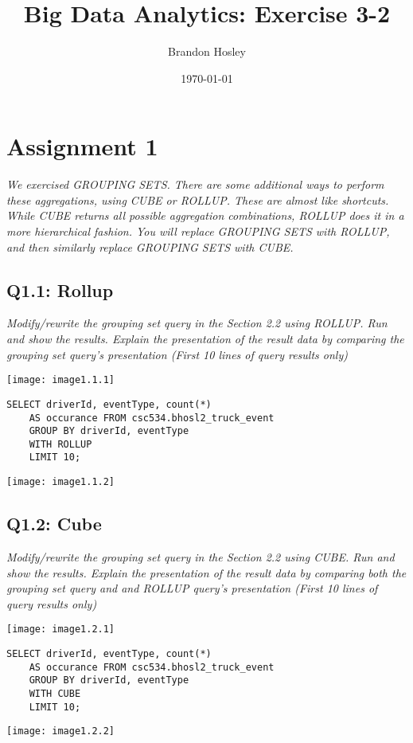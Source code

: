 \documentclass[]{article}
\title{Big Data Analytics: Exercise 3-2}
\author{Brandon Hosley}
\date{\today}
\begin{document}
\maketitle

\section*{Assignment 1}
\emph{We exercised GROUPING SETS. There are some additional ways to perform these aggregations, using CUBE or ROLLUP. These are almost like shortcuts. While CUBE returns all possible aggregation combinations, ROLLUP does it in a more hierarchical fashion. You will replace GROUPING SETS with ROLLUP, and then similarly replace GROUPING SETS with CUBE.}

\subsection*{Q1.1: Rollup} 
\emph{Modify/rewrite the grouping set query in the Section 2.2 using ROLLUP. Run and show the results. Explain the presentation of the result data by comparing the grouping set query’s presentation
(First 10 lines of query results only)}

\texttt{[image: image1.1.1]} %
\begin{verbatim}
SELECT driverId, eventType, count(*) 
	AS occurance FROM csc534.bhosl2_truck_event 
	GROUP BY driverId, eventType 
	WITH ROLLUP
	LIMIT 10;
\end{verbatim}
\texttt{[image: image1.1.2]} %

\subsection*{Q1.2: Cube} 
\emph{Modify/rewrite the grouping set query in the Section 2.2 using CUBE. Run and show the results. Explain the presentation of the result data by comparing both the grouping set query and and ROLLUP query’s presentation
(First 10 lines of query results only)}

\texttt{[image: image1.2.1]} %
\begin{verbatim}
SELECT driverId, eventType, count(*) 
	AS occurance FROM csc534.bhosl2_truck_event 
	GROUP BY driverId, eventType 
	WITH CUBE
	LIMIT 10;
\end{verbatim}
\texttt{[image: image1.2.2]} %
\end{document}
